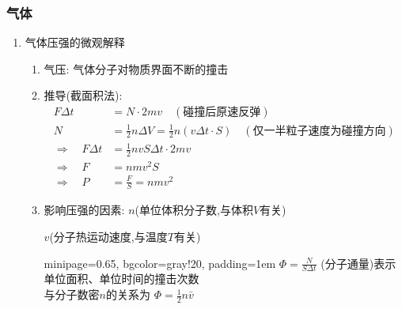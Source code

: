 \documentclass{article}
\begin{document}
\subsubsection{气体}
\begin{enumerate}
    \item 气体压强的微观解释
          \begin{enumerate}[label = (\arabic*)]
              \item 气压: 气体分子对物质界面不断的撞击

              \item 推导(截面积法):
                    \begin{align*}
                        F \Delta t                      & = N \cdot 2mv \quad (\text{碰撞后原速反弹})                                                      \\
                        N                               & = \frac{1}{2} n \Delta V = \frac{1}{2} n (v \Delta t \cdot S) \quad (\text{仅一半粒子速度为碰撞方向}) \\
                        \Longrightarrow\quad F \Delta t & = \frac{1}{2} n v S \Delta t \cdot 2mv                                                    \\
                        \Longrightarrow\quad F          & = nmv^2 S                                                                                 \\
                        \Longrightarrow\quad P          & = \frac{F}{S} = nmv^2
                    \end{align*}

              \item 影响压强的因素:
                    $n$(单位体积分子数,与体积$V$有关)

                    \hspace{7.5em} $v$(分子热运动速度,与温度$T$有关)

                    \vspace{-1em}
                    \hspace{-0.9em}
                    \begin{adjustbox}{minipage=0.65\linewidth, bgcolor=gray!20, padding=1em}
                        \small
                        $\Phi = \frac{N}{S \Delta t}$ (分子通量)表示单位面积、单位时间的撞击次数\\
                        与分子数密$n$的关系为 $\displaystyle \Phi = \frac{1}{2}n\bar{v}$
                    \end{adjustbox}
                    \vspace{-1em}
          \end{enumerate}
\end{enumerate}
\end{document}
